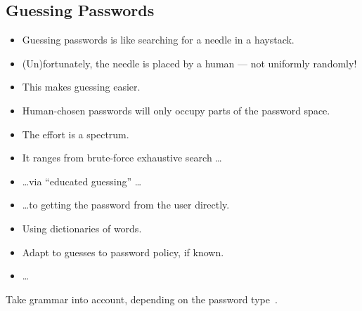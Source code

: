 
\subsection{Guessing Passwords}

\begin{frame}
  \begin{itemize}
    \item Guessing passwords is like searching for a needle in a haystack.

      \pause{}

    \item (Un)fortunately, the needle is placed by a human --- not uniformly 
      randomly!
    \item This makes guessing easier.
    \item Human-chosen passwords will only occupy parts of the password space.
  \end{itemize}
\end{frame}

\begin{frame}
  \begin{itemize}
    \item The effort is a spectrum.

    \item It ranges from brute-force exhaustive search \dots

      \pause{}

    \item \dots via \enquote{educated guessing} \dots

      \pause{}

    \item \dots to getting the password from the user directly.
  \end{itemize}
\end{frame}

\begin{frame}
  \begin{example}
    \begin{itemize}
      \item Using dictionaries of words.
      \item Adapt to guesses to password policy, if known.
      \item \dots
    \end{itemize}
  \end{example}

  \pause{}

  \begin{example}
    Take grammar into account, depending on the password 
    type~\cite{Bonneau2012ghs,Bonneau2012lpo}.
  \end{example}
\end{frame}

